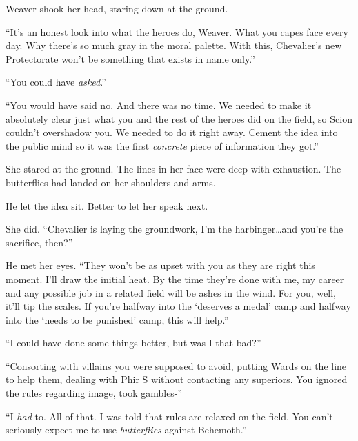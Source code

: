 Weaver shook her head, staring down at the ground.



``It's an honest look into what the heroes do, Weaver.  What you capes face every day.  Why there's so much gray in the moral palette.  With this, Chevalier's new Protectorate won't be something that exists in name only.''



``You could have \emph{asked}.''



``You would have said no.  And there was no time.  We needed to make it absolutely clear just what you and the rest of the heroes did on the field, so Scion couldn't overshadow you.  We needed to do it right away.  Cement the idea into the public mind so it was the first \emph{concrete} piece of information they got.''



She stared at the ground.  The lines in her face were deep with exhaustion.  The butterflies had landed on her shoulders and arms.



He let the idea sit.  Better to let her speak next.



She did.  ``Chevalier is laying the groundwork, I'm the harbinger\ldots and you're the sacrifice, then?''



He met her eyes.  ``They won't be as upset with you as they are right this moment.  I'll draw the initial heat.  By the time they're done with me, my career and any possible job in a related field will be ashes in the wind.  For you, well, it'll tip the scales.  If you're halfway into the `deserves a medal' camp and halfway into the `needs to be punished' camp, this will help.''



``I could have done some things better, but was I that bad?''



``Consorting with villains you were supposed to avoid, putting Wards on the line to help them, dealing with Phir S without contacting any superiors.  You ignored the rules regarding image, took gambles-''



``I \emph{had} to.  All of that.  I was told that rules are relaxed on the field.  You can't seriously expect me to use \emph{butterflies} against Behemoth.''



